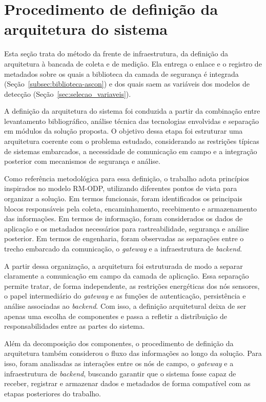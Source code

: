\section{Procedimento de definição da arquitetura do sistema}

Esta seção trata do método da frente de infraestrutura, da definição da arquitetura à bancada de coleta e de medição. Ela entrega o enlace e o registro de metadados sobre os quais a biblioteca da camada de segurança é integrada (Seção~\ref{subsec:biblioteca-ascon}) e dos quais saem as variáveis dos modelos de detecção (Seção~\ref{sec:selecao_variaveis}).

A definição da arquitetura do sistema foi conduzida a partir da combinação entre levantamento bibliográfico, análise técnica das tecnologias envolvidas e separação em módulos da solução proposta. O objetivo dessa etapa foi estruturar uma arquitetura coerente com o problema estudado, considerando as restrições típicas de sistemas embarcados, a necessidade de comunicação em campo e a integração posterior com mecanismos de segurança e análise.

Como referência metodológica para essa definição, o trabalho adota princípios inspirados no modelo RM-ODP, utilizando diferentes pontos de vista para organizar a solução. Em termos funcionais, foram identificados os principais blocos responsáveis pela coleta, encaminhamento, recebimento e armazenamento das informações. Em termos de informação, foram considerados os dados de aplicação e os metadados necessários para rastreabilidade, segurança e análise posterior. Em termos de engenharia, foram observadas as separações entre o trecho embarcado da comunicação, o \textit{gateway} e a infraestrutura de \textit{backend}.

A partir dessa organização, a arquitetura foi estruturada de modo a separar claramente a comunicação em campo da camada de aplicação. Essa separação permite tratar, de forma independente, as restrições energéticas dos nós sensores, o papel intermediário do \textit{gateway} e as funções de autenticação, persistência e análise associadas ao \textit{backend}. Com isso, a definição arquitetural deixa de ser apenas uma escolha de componentes e passa a refletir a distribuição de responsabilidades entre as partes do sistema.

Além da decomposição dos componentes, o procedimento de definição da arquitetura também considerou o fluxo das informações ao longo da solução. Para isso, foram analisadas as interações entre os nós de campo, o \textit{gateway} e a infraestrutura de \textit{backend}, buscando garantir que o sistema fosse capaz de receber, registrar e armazenar dados e metadados de forma compatível com as etapas posteriores do trabalho.

